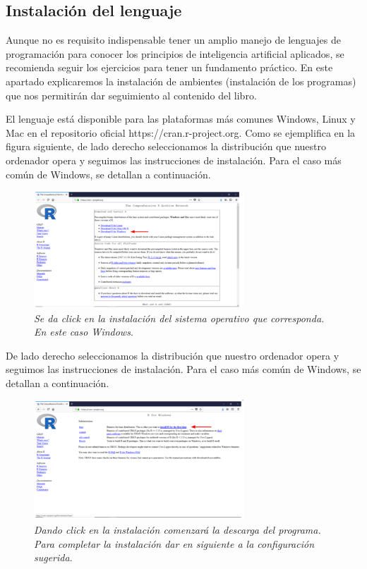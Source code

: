\documentclass[letterpaper,12pt, spanish, oneside]{book} %
\begin{document}
\subsection{Instalación del lenguaje}

Aunque no es requisito indispensable tener un amplio manejo de lenguajes de programación para conocer los principios de inteligencia artificial aplicados, se recomienda seguir los ejercicios para tener un fundamento práctico. En este apartado explicaremos la instalación de ambientes (instalación de los programas) que nos permitirán dar seguimiento al contenido del libro.

El lenguaje está disponible para las plataformas más comunes Windows, Linux y Mac en el repositorio oficial https://cran.r-project.org. Como se ejemplifica en la figura siguiente, de lado derecho seleccionamos la distribución que nuestro ordenador opera y seguimos las instrucciones de instalación. Para el caso más común de  Windows, se detallan a continuación.

\begin{figure}[H]
\centering
\includegraphics[width=0.7\textwidth]{t1.png}
\caption{\label{fig:frog2}\textit{Se da click en la instalación del sistema operativo que corresponda. En este caso Windows}.}
\end{figure}

De lado derecho seleccionamos la distribución que nuestro ordenador opera y seguimos las instrucciones de instalación. Para el caso más común de  Windows, se detallan a continuación.

\begin{figure}[H]
\centering
\includegraphics[width=0.7\textwidth]{t2.png}
\caption{\label{fig:frog2}\textit{Dando click en la instalación comenzará la descarga del programa. Para completar la instalación dar en siguiente a la configuración sugerida}.}
\end{figure}
\end{document}
